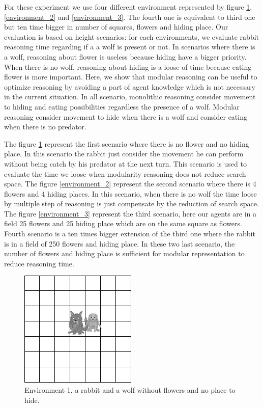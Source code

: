 \documentclass{aamas2012}
\begin{document}
	For these experiment we use four different environment represented by figure \ref{environment_1}, \ref{environment_2} and \ref{environment_3}.
	The fourth one is equivalent to third one but ten time bigger in number of squares, flowers and hiding place.
	Our evaluation is based on height scenarios: for each environments, we evaluate rabbit reasoning time regarding if a a wolf is present or not.
	In scenarios where there is a wolf, reasoning about flower is useless because hiding have a bigger priority.
	When there is no wolf, reasoning about hiding is a loose of time because eating flower is more important.
	Here, we show that modular reasoning can be useful to optimize reasoning by avoiding a part of agent knowledge which is not necessary in the current situation.
	In all scenario, monolithic reasoning consider movement to hiding and eating possibilities regardless the presence of a wolf.
	Modular reasoning consider movement to hide when there is a wolf and consider eating when there is no predator.
	
	The figure \ref{environment_1} represent the first scenario where there is no flower and no hiding place.
	In this scenario the rabbit just consider the movement he can perform without being catch by his predator at the next turn.
	This scenario is used to evaluate the time we loose when modularity reasoning does not reduce search space.
	The figure \ref{environment_2} represent the second scenario where there is 4 flowers and 4 hiding places.
	In this scenario, when there is no wolf the time loose by multiple step of reasoning is just compensate by the reduction of search space.
	The figure \ref{environment_3} represent the third scenario, here our agents are in a field 25 flowers and 25 hiding place which are on the same square as flowers.
	Fourth scenario is a ten times bigger extension of the third one where the rabbit is in a field of 250 flowers and hiding place. 
	In these two last scenario, the number of flowers and hiding place is sufficient for modular representation to reduce reasoning time.
	
	\begin{figure}
		\centering
		\includegraphics[keepaspectratio=true, scale=0.5]{environment_1.png}
		\caption
		{
			\label{environment_1}
			Environment 1, a rabbit and a wolf without flowers and no place to hide.
		}
	\end{figure}
\end{document}

